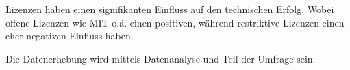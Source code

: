 
\begin{hypothesis}
    Lizenzen haben einen signifikanten Einfluss auf den technischen Erfolg. 
    Wobei offene Lizenzen wie MIT o.ä. einen positiven,
    während restriktive Lizenzen einen eher negativen Einfluss haben.
\end{hypothesis}

\noindent
Die Datenerhebung wird mittels Datenanalyse und Teil der Umfrage sein. 
